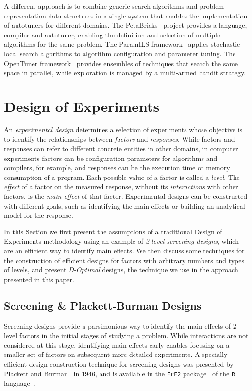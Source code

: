 \documentclass[conference]{IEEEtran}
\begin{document}
A different approach is to combine generic search algorithms and problem
representation data structures in a single system that enables the
implementation of autotuners for different domains. The
PetaBricks~\cite{ansel2009petabricks} project provides a language,
compiler and autotuner, enabling the definition and selection of multiple
algorithms for the same problem. The ParamILS
framework~\cite{hutter2009paramils} applies stochastic local search
algorithms to algorithm configuration and parameter tuning. The OpenTuner
framework~\cite{ansel2014opentuner} provides ensembles of techniques that
search the same space in parallel, while exploration is managed by a multi-armed
bandit strategy.
\section{Design of Experiments}
\label{sec:orgd89b55c}
An \emph{experimental design} determines a selection of experiments whose objective
is to identify the relationships between \emph{factors} and \emph{responses}. While
factors and responses can refer to different concrete entities in other domains,
in computer experiments factors can be configuration parameters for algorithms
and compilers, for example, and responses can be the execution time or memory
consumption of a program. Each possible value of a factor is called a \emph{level}.
The \emph{effect} of a factor on the measured response, without its \emph{interactions}
with other factors, is the \emph{main effect} of that factor. Experimental designs
can be constructed with different goals, such as identifying the main effects
or building an analytical model for the response.

In this Section we first present the assumptions of a traditional Design of
Experiments methodology using an example of \emph{2-level screening designs}, which
are an efficient way to identify main effects. We then discuss some techniques
for the construction of efficient designs for factors with arbitrary numbers and
types of levels, and present \emph{D-Optimal} designs, the technique we use in the
approach presented in this paper.
\subsection{Screening \& Plackett-Burman Designs}
\label{sec:org0de9bfe}
Screening designs provide a parsimonious way to identify the main
effects of 2-level factors in the initial stages of studying a problem. While
interactions are not considered at this stage, identifying main effects early
enables focusing on a smaller set of factors on subsequent more detailed
experiments. A specially efficient design construction technique for screening
designs was presented by Plackett and Burman~\cite{plackett1946design} in
1946, and is available in the \texttt{FrF2}
package~\cite{gromping2014frf2} of the \texttt{R}
language~\cite{team2018rlanguage}.
\end{document}
